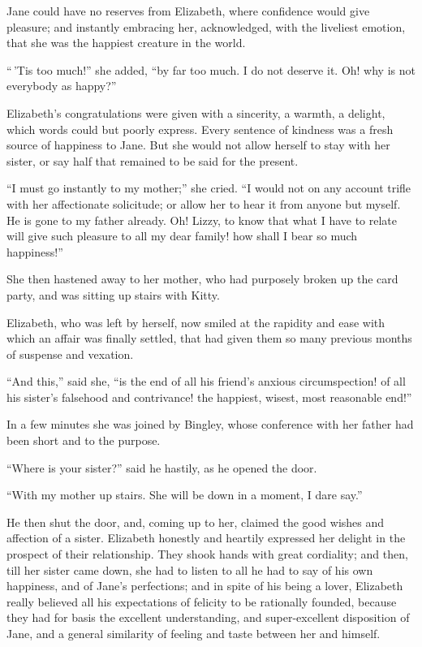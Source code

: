 Jane could have no reserves from Elizabeth, where confidence
would give pleasure; and instantly embracing her, acknowledged,
with the liveliest emotion, that she was the happiest creature
in the world.

``\,'Tis too much!'' she added, ``by far too much.  I do not
deserve it.  Oh! why is not everybody as happy?''

Elizabeth's congratulations were given with a sincerity, a
warmth, a delight, which words could but poorly express.  Every
sentence of kindness was a fresh source of happiness to Jane.
But she would not allow herself to stay with her sister, or say
half that remained to be said for the present.

``I must go instantly to my mother;'' she cried.  ``I would not on
any account trifle with her affectionate solicitude; or allow
her to hear it from anyone but myself.  He is gone to my
father already.  Oh! Lizzy, to know that what I have to relate
will give such pleasure to all my dear family! how shall I
bear so much happiness!''

She then hastened away to her mother, who had purposely broken
up the card party, and was sitting up stairs with Kitty.

Elizabeth, who was left by herself, now smiled at the rapidity
and ease with which an affair was finally settled, that had
given them so many previous months of suspense and vexation.

``And this,'' said she, ``is the end of all his friend's anxious
circumspection! of all his sister's falsehood and contrivance!
the happiest, wisest, most reasonable end!''

In a few minutes she was joined by Bingley, whose conference
with her father had been short and to the purpose.

``Where is your sister?'' said he hastily, as he opened the door.

``With my mother up stairs.  She will be down in a moment,
I dare say.''

He then shut the door, and, coming up to her, claimed the good
wishes and affection of a sister.  Elizabeth honestly and
heartily expressed her delight in the prospect of their
relationship.  They shook hands with great cordiality; and
then, till her sister came down, she had to listen to all he
had to say of his own happiness, and of Jane's perfections;
and in spite of his being a lover, Elizabeth really believed
all his expectations of felicity to be rationally founded,
because they had for basis the excellent understanding, and
super-excellent disposition of Jane, and a general similarity
of feeling and taste between her and himself.

